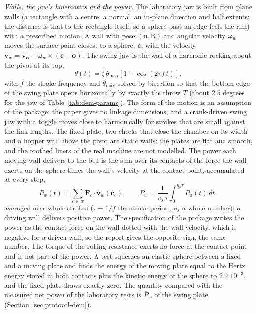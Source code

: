 \emph{Walls, the jaw's kinematics and the power.} The laboratory jaw is built from plane walls (a rectangle with a centre, a normal, an in-plane direction and half extents; the distance is
that to the rectangle itself, so a sphere past an edge feels the rim) with a prescribed motion. A wall with pose $(\mathbf o,\mathrm R)$ and angular velocity $\boldsymbol\omega_w$ moves the surface
point closest to a sphere, $\mathbf c$, with the velocity $\mathbf v_w=\mathbf v_{\mathbf o}+\boldsymbol\omega_w\times(\mathbf c-\mathbf o)$. The swing jaw is the wall of a harmonic rocking about the pivot at its top,
\begin{equation}
\theta(t)=\tfrac12\,\theta_{\max}\left[1-\cos(2\pi f\,t)\right],
\label{eq:dem-rocking}
\end{equation}
with $f$ the stroke frequency and $\theta_{\max}$ solved by bisection so that the bottom edge of the swing plate opens horizontally by exactly the throw $T$ (about $2.5$ degrees for the jaw of
Table~\ref{tab:dem-params}). The form of the motion is an assumption of the package: the paper gives no linkage dimensions, and a crank-driven swing jaw with a toggle moves close to harmonically
for strokes that are small against the link lengths. The fixed plate, two cheeks that close the chamber on its width and a hopper wall above the pivot are static walls; the plates are flat and smooth, and the toothed liners of the real machine are not modelled.
The power each moving wall delivers to the bed is the sum over its contacts of the force the wall exerts on the sphere times the wall's velocity at the contact point, accumulated at every step,
\begin{equation}
P_w(t)=\sum_{c\in w}\mathbf F_{c}\cdot\mathbf v_w(\mathbf c_c),\qquad \bar P_w=\frac{1}{n_{\mathrm s}\,\tau}\int_{0}^{n_{\mathrm s}\tau}P_w(t)\,dt ,
\label{eq:dem-power}
\end{equation}
averaged over whole strokes ($\tau=1/f$ the stroke period, $n_{\mathrm s}$ a whole number); a driving wall delivers positive power. The specification of the package writes the power as the contact force on the wall
dotted with the wall velocity, which is negative for a driven wall, so the report gives the opposite sign, the same number. The torque of the rolling resistance exerts no force at the contact point and is not part of
the power. A test squeezes an elastic sphere between a fixed and a moving plate and finds the energy of the moving plate equal to the Hertz energy stored in both contacts plus the kinetic energy of the sphere to $2\times10^{-3}$,
and the fixed plate draws exactly zero. The quantity compared with the measured net power of the laboratory tests is $\bar P_w$ of the swing plate (Section~\ref{sec:protocol-dem}).

